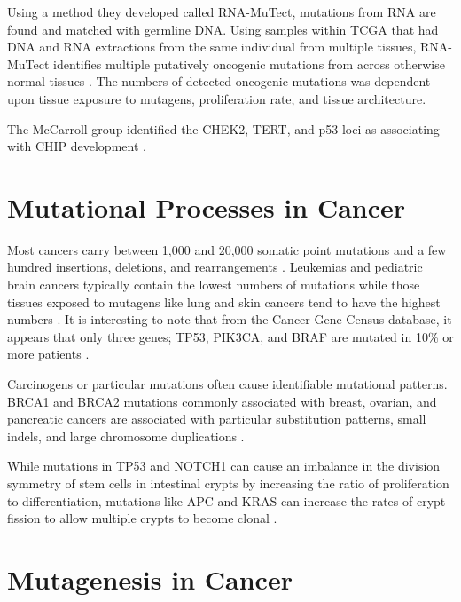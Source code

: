 \documentclass[]{book}
\begin{document}
Using a method they developed called RNA-MuTect, mutations from RNA are found and matched with germline DNA. Using samples within TCGA that had DNA and RNA extractions from the same individual from multiple tissues, RNA-MuTect identifies multiple putatively oncogenic mutations from across otherwise normal tissues \citep{Yizhak2019-ch}. The numbers of detected oncogenic mutations was dependent upon tissue exposure to mutagens, proliferation rate, and tissue architecture.

The McCarroll group identified the CHEK2, TERT, and p53 loci as associating with CHIP development \citep{Loh2018-xo}.

\hypertarget{mutational-processes-in-cancer}{%
\section{Mutational Processes in Cancer}\label{mutational-processes-in-cancer}}

Most cancers carry between 1,000 and 20,000 somatic point mutations and a few hundred insertions, deletions, and rearrangements \citep{martincorena2015somatic}. Leukemias and pediatric brain cancers typically contain the lowest numbers of mutations while those tissues exposed to mutagens like lung and skin cancers tend to have the highest numbers \citep{stephens2009complex, alexandrov2013signatures, lawrence2013mutational, vogelstein2013cancer}. It is interesting to note that from the Cancer Gene Census database, it appears that only three genes; TP53, PIK3CA, and BRAF are mutated in 10\% or more patients \citep{martincorena2015somatic}.

Carcinogens or particular mutations often cause identifiable mutational patterns. BRCA1 and BRCA2 mutations commonly associated with breast, ovarian, and pancreatic cancers are associated with particular substitution patterns, small indels, and large chromosome duplications \citep{nik2012mutational}.

While mutations in TP53 and NOTCH1 can cause an imbalance in the division symmetry of stem cells in intestinal crypts by increasing the ratio of proliferation to differentiation\citep{klein2010stochastic, alcolea2014differentiation}, mutations like APC and KRAS can increase the rates of crypt fission to allow multiple crypts to become clonal \citep{preston2003bottom, snippert2014biased}.

\hypertarget{mutagenesis-in-cancer}{%
\section{Mutagenesis in Cancer}\label{mutagenesis-in-cancer}}
\end{document}
